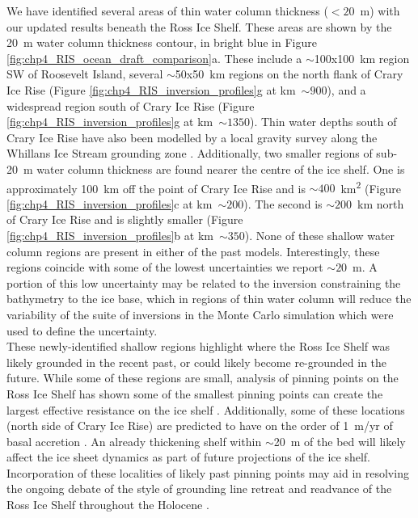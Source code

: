We have identified several areas of thin water column thickness ($<20$~m) with our updated results beneath the Ross Ice Shelf. These areas are shown by the 20~m water column thickness contour, in bright blue in Figure \ref{fig:chp4_RIS_ocean_draft_comparison}a. These include a $\sim$100x100~km region SW of Roosevelt Island, several $\sim$50x50~km regions on the north flank of Crary Ice Rise (Figure \ref{fig:chp4_RIS_inversion_profiles}g at km~$\sim900$), and a widespread region south of Crary Ice Rise (Figure \ref{fig:chp4_RIS_inversion_profiles}g at km~$\sim1350$). Thin water depths south of Crary Ice Rise have also been modelled by a local gravity survey along the Whillans Ice Stream grounding zone \citep{mutobathymetry2013}. Additionally, two smaller regions of sub-20~m water column thickness are found nearer the centre of the ice shelf. One is approximately 100~km off the point of Crary Ice Rise and is $\sim400$~km\textsuperscript{2} (Figure \ref{fig:chp4_RIS_inversion_profiles}c at km~$\sim200$). The second is $\sim200$~km north of Crary Ice Rise and is slightly smaller (Figure \ref{fig:chp4_RIS_inversion_profiles}b at km~$\sim350$). None of these shallow water column regions are present in either of the past models. Interestingly, these regions coincide with some of the lowest uncertainties we report $\sim20$~m. A portion of this low uncertainty may be related to the inversion constraining the bathymetry to the ice base, which in regions of thin water column will reduce the variability of the suite of inversions in the Monte Carlo simulation which were used to define the uncertainty.\\

These newly-identified shallow regions highlight where the Ross Ice Shelf was likely grounded in the recent past, or could likely become re-grounded in the future. While some of these regions are small, analysis of pinning points on the Ross Ice Shelf has shown some of the smallest pinning points can create the largest effective resistance on the ice shelf \citep{stillmechanical2019}. Additionally, some of these locations (north side of Crary Ice Rise) are predicted to have on the order of 1~m/yr of basal accretion \citep{adusumilliinterannual2020}. An already thickening shelf within $\sim$20~m of the bed will likely affect the ice sheet dynamics as part of future projections of the ice shelf. Incorporation of these localities of likely past pinning points may aid in resolving the ongoing debate of the style of grounding line retreat and readvance of the Ross Ice Shelf throughout the Holocene \citep{venturellimid2020, kingslakeextensive2018, lowrydeglacial2019}.\\ 


